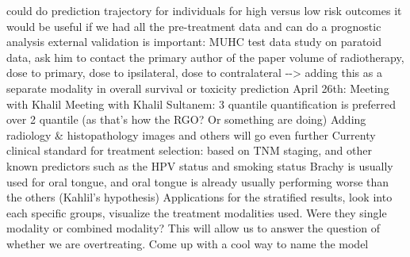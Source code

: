 \documentclass{article}%
\begin{document}
\newline%
\newline%
%
could do prediction trajectory for individuals for high versus low risk outcomes %
\newline%
\newline%
%
it would be useful if we had all the pre{-}treatment data and can do a prognostic analysis %
\newline%
\newline%
%
external validation is important: MUHC test data%
\newline%
\newline%
%
study on paratoid data, ask him to contact the primary author of the paper %
\newline%
\newline%
%
volume of radiotherapy, dose to primary, dose to ipsilateral, dose to contralateral {-}{-}> adding this as a separate modality in overall survival or toxicity prediction%
\newline%
\newline%
%
April 26th: Meeting with Khalil %
\newline%
\newline%
%
%
\newline%
\newline%
%
Meeting with Khalil Sultanem: 3 quantile quantification is preferred over 2 quantile (as that’s how the RGO? Or something are doing) %
\newline%
\newline%
%
Adding radiology \& histopathology images and others will go even further %
\newline%
\newline%
%
Currenty clinical standard for treatment selection: based on TNM staging, and other known predictors such as the HPV status and smoking status%
\newline%
\newline%
%
Brachy is usually used for oral tongue, and oral tongue is already usually performing worse than the others (Kahlil’s hypothesis)%
\newline%
\newline%
%
Applications for the stratified results, look into each specific groups, visualize the treatment modalities used. Were they single modality or combined modality? This will allow us to answer the question of whether we are overtreating. %
\newline%
\newline%
%
Come up with a cool way to name the model %
\end{document}
